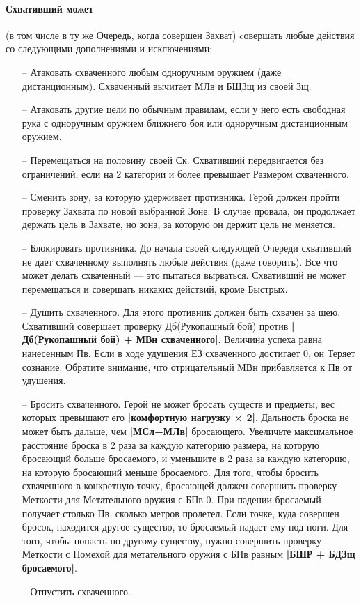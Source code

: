 \paragraph{Схвативший может} (в том числе в ту же Очередь, когда совершен Захват) cовершать любые действия со следующими дополнениями и исключениями:
\begin{itemize}
\item[--] Атаковать схваченного любым одноручным оружием (даже дистанционным). Схваченный вычитает МЛв и БЩЗщ из своей Зщ.
\item[--] Атаковать другие цели по обычным правилам, если у него есть свободная рука с одноручным оружием ближнего боя или одноручным дистанционным оружием.
\item[--] Перемещаться на половину своей Ск. Схвативший передвигается без ограничений, если на 2 категории и более превышает Размером схваченного.
\item[--] Сменить зону, за которую удерживает противника. Герой должен пройти проверку Захвата по новой выбранной Зоне. В случае провала, он продолжает держать цель в Захвате, но зона, за которую он держит цель не меняется.
\item[--] Блокировать противника. До начала своей следующей Очереди схвативший не дает схваченному выполнять любые действия (даже говорить). Все что может делать схваченный — это пытаться вырваться. Схвативший не может перемещаться и совершать никаких действий, кроме Быстрых.
\item[--] Душить схваченного. Для этого противник должен быть схвачен за шею. Схвативший совершает проверку Дб(Рукопашный бой) против \textbf{|Дб(Рукопашный бой) + МВн схваченного|}. Величина успеха равна нанесенным Пв. Если в ходе удушения ЕЗ схваченного достигает 0, он Теряет сознание. Обратите внимание, что отрицательный МВн прибавляется к Пв от удушения.
\item[--] Бросить схваченного. Герой не может бросать существ и предметы, вес которых превышают его \textbf{|комфортную нагрузку × 2|}. Дальность броска не может быть дальше, чем \textbf{|МСл+МЛв|} бросающего. Увеличьте максимальное расстояние броска в 2 раза за каждую категорию размера, на которую бросающий больше бросаемого, и уменьшите в 2 раза за каждую категорию, на которую бросающий меньше бросаемого.
\newline Для того, чтобы бросить схваченного в конкретную точку, бросающей должен совершить проверку Меткости для Метательного оружия с БПв 0. При падении бросаемый получает столько Пв, сколько метров пролетел. Если точке, куда совершен бросок, находится другое существо, то бросаемый падает ему под ноги.
\newline Для того, чтобы попасть по другому существу, нужно совершить проверку Меткости с Помехой для метательного оружия с БПв равным \textbf{|БШР + БДЗщ бросаемого|}.
\item[--] Отпустить схваченного.
\end{itemize}
